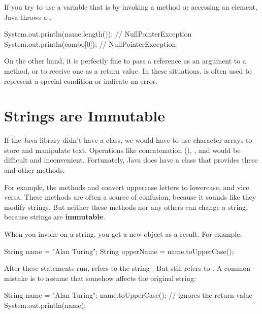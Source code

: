 
If you try to use a variable that is  by invoking a method or accessing an element, Java throws a .

\begin{code}
System.out.println(name.length());  // NullPointerException
System.out.println(combo[0]);       // NullPointerException
\end{code}

On the other hand, it is perfectly fine to pass a  reference as an argument to a method, or to receive one as a return value.
In these situations,  is often used to represent a special condition or indicate an error.


\section{Strings are Immutable}

If the Java library didn't have a  class, we would have to use character arrays to store and manipulate text.
Operations like concatenation (\java{+}), , and  would be difficult and inconvenient.
Fortunately, Java does have a  class that provides these and other methods.


For example, the methods  and  convert uppercase letters to lowercase, and vice versa.
These methods are often a source of confusion, because it sounds like they modify strings.
But neither these methods nor any others can change a string, because strings are {\bf immutable}.

When you invoke  on a string, you get a new  object as a result.
For example:

\begin{code}
String name = "Alan Turing";
String upperName = name.toUpperCase();
\end{code}


After these statements run,  refers to the string .
But  still refers to .
A common mistake is to assume that  somehow affects the original string:

\begin{code}
String name = "Alan Turing";
name.toUpperCase();           // ignores the return value
System.out.println(name);
\end{code}

